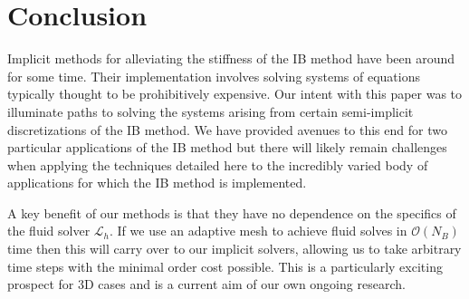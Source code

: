 \documentclass[preprint,12pt]{elsarticle}
\begin{document}
\section{Conclusion}
Implicit methods for alleviating the stiffness of the IB method have been around for some time. Their implementation involves solving systems of equations typically thought to be prohibitively expensive. Our intent with this paper was to illuminate paths to solving the systems arising from certain semi-implicit discretizations of the IB method. We have provided avenues to this end for two particular applications of the IB method but there will likely remain challenges when applying the techniques detailed here to the incredibly varied body of applications for which the IB method is implemented.

A key benefit of our methods is that they have no dependence on the specifics of the fluid solver $\mathcal{L}_h$. If we use an adaptive mesh to achieve fluid solves in $\mathcal{O}(N_B)$ time then this will carry over to our implicit solvers, allowing us to take arbitrary time steps with the minimal order cost possible. This is a particularly exciting prospect for 3D cases and is a current aim of our own ongoing research.










\end{document}
